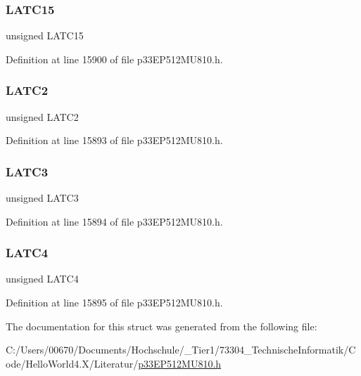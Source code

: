\subsubsection{\texorpdfstring{L\+A\+T\+C15}{LATC15}}
{\footnotesize\ttfamily unsigned L\+A\+T\+C15}



Definition at line 15900 of file p33\+E\+P512\+M\+U810.\+h.

\mbox{\label{structtag_l_a_t_c_b_i_t_s_a2a587811fb903e7f3e4462fd8d789df3}} 
\subsubsection{\texorpdfstring{L\+A\+T\+C2}{LATC2}}
{\footnotesize\ttfamily unsigned L\+A\+T\+C2}



Definition at line 15893 of file p33\+E\+P512\+M\+U810.\+h.

\mbox{\label{structtag_l_a_t_c_b_i_t_s_a00c607221d4806a6d99270611ad8474f}} 
\subsubsection{\texorpdfstring{L\+A\+T\+C3}{LATC3}}
{\footnotesize\ttfamily unsigned L\+A\+T\+C3}



Definition at line 15894 of file p33\+E\+P512\+M\+U810.\+h.

\mbox{\label{structtag_l_a_t_c_b_i_t_s_a552fc80c0dd1a68538a10e5711aa39fa}} 
\subsubsection{\texorpdfstring{L\+A\+T\+C4}{LATC4}}
{\footnotesize\ttfamily unsigned L\+A\+T\+C4}



Definition at line 15895 of file p33\+E\+P512\+M\+U810.\+h.



The documentation for this struct was generated from the following file\+:\begin{DoxyCompactItemize}
\item 
C\+:/\+Users/00670/\+Documents/\+Hochschule/\+\_\+\+Tier1/73304\+\_\+\+Technische\+Informatik/\+Code/\+Hello\+World4.\+X/\+Literatur/\hyperlink{p33_e_p512_m_u810_8h}{p33\+E\+P512\+M\+U810.\+h}\end{DoxyCompactItemize}
